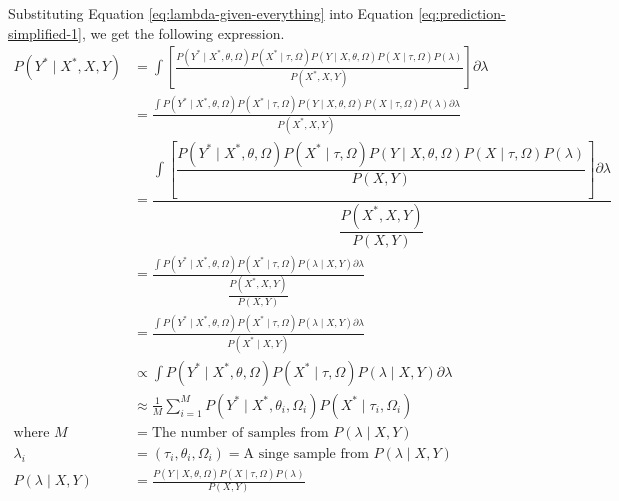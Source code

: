 \documentclass{article}
\begin{document}
Substituting Equation \ref{eq:lambda-given-everything} into Equation \ref{eq:prediction-simplified-1}, we get the following expression.
\begin{equation}
\label{eq:prediction-simplified-2}
\begin{aligned}
P \left( Y^{*} \mid X^{*}, X, Y \right) &= \int \left[ \frac{P \left( Y^{*} \mid X^{*}, \theta, \Omega \right) P \left( X^{*} \mid \tau, \Omega \right) P \left( Y \mid X, \theta, \Omega \right) P \left( X \mid \tau, \Omega \right) P \left( \lambda \right)}{P \left( X^{*}, X, Y \right)} \right] \partial \lambda\\
&= \frac{ \int P \left( Y^{*} \mid X^{*}, \theta, \Omega \right) P \left( X^{*} \mid \tau, \Omega \right) P \left( Y \mid X, \theta, \Omega \right) P \left( X \mid \tau, \Omega \right) P \left( \lambda \right) \partial \lambda }{P \left( X^{*}, X, Y \right)}\\
&= \dfrac{ \int \left[ \dfrac{P \left( Y^{*} \mid X^{*}, \theta, \Omega \right) P \left( X^{*} \mid \tau, \Omega \right) P \left( Y \mid X, \theta, \Omega \right) P \left( X \mid \tau, \Omega \right) P \left( \lambda \right)}{P \left( X, Y \right)} \right] \partial \lambda }{\dfrac{P \left( X^{*}, X, Y \right)}{P \left( X, Y \right)}}\\
&= \frac{ \int P \left( Y^{*} \mid X^{*}, \theta, \Omega \right) P \left( X^{*} \mid \tau, \Omega \right) P \left( \lambda \mid X, Y \right) \partial \lambda }{\dfrac{P \left( X^{*}, X, Y \right)}{P \left( X, Y \right)}}\\
&= \frac{ \int P \left( Y^{*} \mid X^{*}, \theta, \Omega \right) P \left( X^{*} \mid \tau, \Omega \right) P \left( \lambda \mid X, Y \right) \partial \lambda }{P \left( X^{*} \mid X, Y \right)}\\
&\propto  \int P \left( Y^{*} \mid X^{*}, \theta, \Omega \right) P \left( X^{*} \mid \tau, \Omega \right) P \left( \lambda \mid X, Y \right) \partial \lambda\\
&\approx \frac{1}{M} \sum _{i=1} ^M P \left( Y^{*} \mid X^{*}, \theta_i, \Omega_i \right) P \left( X^{*} \mid \tau_i, \Omega_i \right)\\
\textrm{where } M &= \textrm{The number of samples from $P \left( \lambda \mid X, Y \right)$}\\
\lambda_i &= \left( \tau_i, \theta_i, \Omega_i \right) = \textrm{A singe sample from $P \left( \lambda \mid X, Y \right)$}\\
P \left( \lambda \mid X, Y \right) &= \frac{P \left( Y \mid X, \theta, \Omega \right) P \left( X \mid \tau, \Omega \right) P \left( \lambda \right)}{P \left( X, Y \right)}
\end{aligned}
\end{equation}
\end{document}

